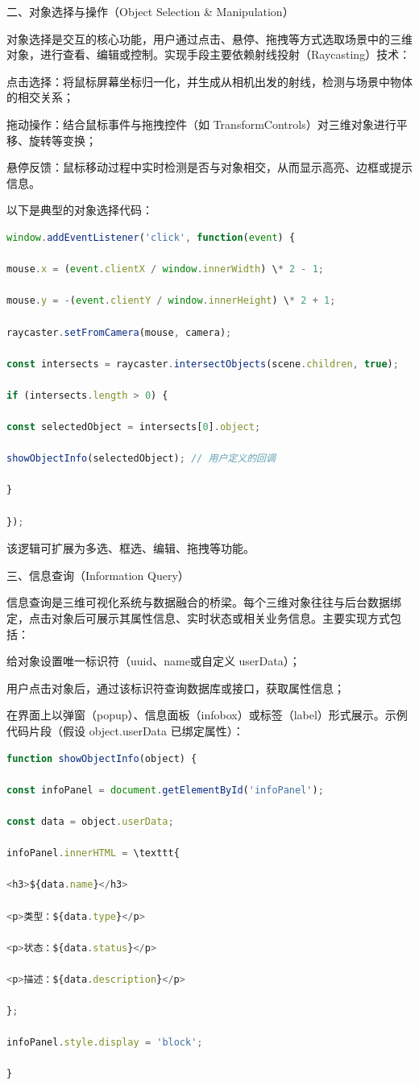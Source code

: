 二、对象选择与操作（Object Selection \& Manipulation）

对象选择是交互的核心功能，用户通过点击、悬停、拖拽等方式选取场景中的三维对象，进行查看、编辑或控制。实现手段主要依赖射线投射（Raycasting）技术：

点击选择：将鼠标屏幕坐标归一化，并生成从相机出发的射线，检测与场景中物体的相交关系；

拖动操作：结合鼠标事件与拖拽控件（如 TransformControls）对三维对象进行平移、旋转等变换；

悬停反馈：鼠标移动过程中实时检测是否与对象相交，从而显示高亮、边框或提示信息。

以下是典型的对象选择代码：

\begin{lstlisting}[language=Javascript]
window.addEventListener('click', function(event) {

mouse.x = (event.clientX / window.innerWidth) \* 2 - 1;

mouse.y = -(event.clientY / window.innerHeight) \* 2 + 1;

raycaster.setFromCamera(mouse, camera);

const intersects = raycaster.intersectObjects(scene.children, true);

if (intersects.length > 0) {

const selectedObject = intersects[0].object;

showObjectInfo(selectedObject); // 用户定义的回调

}

});
\end{lstlisting}

该逻辑可扩展为多选、框选、编辑、拖拽等功能。

三、信息查询（Information Query）

信息查询是三维可视化系统与数据融合的桥梁。每个三维对象往往与后台数据绑定，点击对象后可展示其属性信息、实时状态或相关业务信息。主要实现方式包括：

给对象设置唯一标识符（uuid、name或自定义 userData）；

用户点击对象后，通过该标识符查询数据库或接口，获取属性信息；

在界面上以弹窗（popup）、信息面板（infobox）或标签（label）形式展示。示例代码片段（假设 object.userData 已绑定属性）：

\begin{lstlisting}[language=Javascript]
function showObjectInfo(object) {

const infoPanel = document.getElementById('infoPanel');

const data = object.userData;

infoPanel.innerHTML = \texttt{

<h3>${data.name}</h3>

<p>类型：${data.type}</p>

<p>状态：${data.status}</p>

<p>描述：${data.description}</p>

};

infoPanel.style.display = 'block';

}
\end{lstlisting}

